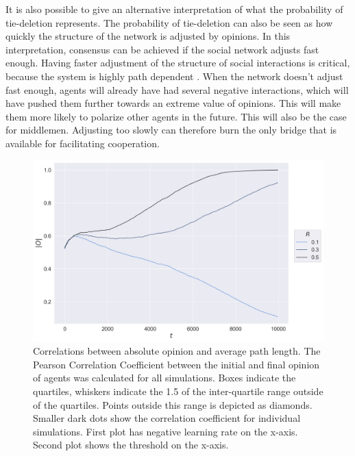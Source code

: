 \documentclass{article}
\begin{document}
It is also possible to give an alternative interpretation of what the probability of tie-deletion represents. The probability of tie-deletion can also be seen as how quickly the structure of the network is adjusted by opinions. In this interpretation, consensus can be achieved if the social network adjusts fast enough. Having faster adjustment of the structure of social interactions is critical, because the system is highly path dependent \cite{turner_paths_2018}.  When the network doesn’t adjust fast enough, agents will already have had several negative interactions, which will have pushed them further towards an extreme value of opinions. This will make them more likely to polarize other agents in the future. This will also be the case for middlemen. Adjusting too slowly can therefore burn the only bridge that is available for facilitating cooperation.  

\begin{figure}[H]
    \centering
    \includegraphics[width=.8\linewidth]{../plots/example/Example_Absolute_Opinion.png}
  \caption{Correlations between absolute opinion and average path length. The Pearson Correlation Coefficient between the initial and final opinion of agents was calculated for all simulations. Boxes indicate the quartiles, whiskers indicate the 1.5 of the inter-quartile range outside of the quartiles. Points outside this range is depicted as diamonds. Smaller dark dots show the correlation coefficient for individual simulations. First plot has negative learning rate on the x-axis. Second plot shows the threshold on the x-axis. }
  \label{fig:sfig1}
\end{figure}
\end{document}
